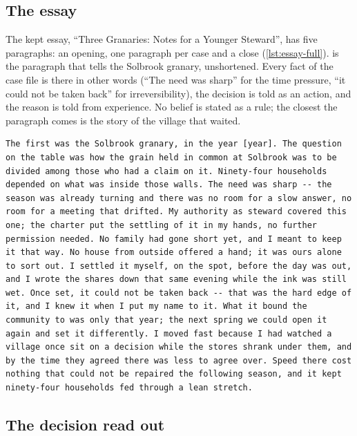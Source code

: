 \subsection{The essay}

The kept essay, ``Three Granaries: Notes for a Younger Steward'', has five paragraphs: an
opening, one paragraph per case and a close (\cref{lst:essay-full}).  is the
paragraph that tells the Solbrook granary, unshortened. Every fact of the case file is there in
other words (``The need was sharp'' for the time pressure, ``it could not be taken back'' for
irreversibility), the decision is told as an action, and the reason is told from experience.
No belief is stated as a rule; the closest the paragraph comes is the story of the village
that waited.
\begin{lstlisting}[caption={The paragraph of the kept essay that tells the Solbrook granary.},label={lst:essay}]
The first was the Solbrook granary, in the year [year]. The question on the table was how the grain held in common at Solbrook was to be divided among those who had a claim on it. Ninety-four households depended on what was inside those walls. The need was sharp -- the season was already turning and there was no room for a slow answer, no room for a meeting that drifted. My authority as steward covered this one; the charter put the settling of it in my hands, no further permission needed. No family had gone short yet, and I meant to keep it that way. No house from outside offered a hand; it was ours alone to sort out. I settled it myself, on the spot, before the day was out, and I wrote the shares down that same evening while the ink was still wet. Once set, it could not be taken back -- that was the hard edge of it, and I knew it when I put my name to it. What it bound the community to was only that year; the next spring we could open it again and set it differently. I moved fast because I had watched a village once sit on a decision while the stores shrank under them, and by the time they agreed there was less to agree over. Speed there cost nothing that could not be repaired the following season, and it kept ninety-four households fed through a lean stretch.
\end{lstlisting}

\subsection{The decision read out}

